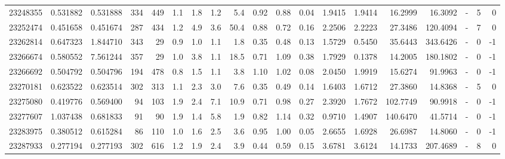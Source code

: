\begin{tabular}{rrrrrrrrrrrrrrrrlrr}
  23248355 & 0.531882 &   0.531888 &  334 &  449 &      1.1 &      1.8 &     1.2 &      5.4 &       0.92 &        0.88 &        0.04 &  1.9415 &  1.9414 &   16.2999 &   16.3092 &             - &        5 &          0 \\
  23252474 & 0.451658 &   0.451674 &  287 &  434 &      1.2 &      4.9 &     3.6 &     50.4 &       0.88 &        0.72 &        0.16 &  2.2506 &  2.2223 &   27.3486 &  120.4094 &             - &        7 &          0 \\
  23262814 & 0.647323 &   1.844710 &  343 &   29 &      0.9 &      1.0 &     1.1 &      1.8 &       0.35 &        0.48 &        0.13 &  1.5729 &  0.5450 &   35.6443 &  343.6426 &             - &        0 &         -1 \\
  23266674 & 0.580552 &   7.561244 &  357 &   29 &      1.0 &      3.8 &     1.1 &     18.5 &       0.71 &        1.09 &        0.38 &  1.7929 &  0.1378 &   14.2005 &  180.1802 &             - &        0 &         -1 \\
  23266692 & 0.504792 &   0.504796 &  194 &  478 &      0.8 &      1.5 &     1.1 &      3.8 &       1.10 &        1.02 &        0.08 &  2.0450 &  1.9919 &   15.6274 &   91.9963 &             - &        0 &         -1 \\
  23270181 & 0.623522 &   0.623514 &  302 &  313 &      1.1 &      2.3 &     3.0 &      7.6 &       0.35 &        0.49 &        0.14 &  1.6403 &  1.6712 &   27.3860 &   14.8368 &             - &        5 &          0 \\
  23275080 & 0.419776 &   0.569400 &   94 &  103 &      1.9 &      2.4 &     7.1 &     10.9 &       0.71 &        0.98 &        0.27 &  2.3920 &  1.7672 &  102.7749 &   90.9918 &             - &        0 &         -1 \\
  23277607 & 1.037438 &   0.681833 &   91 &   90 &      1.9 &      1.4 &     5.8 &      1.9 &       0.82 &        1.14 &        0.32 &  0.9710 &  1.4907 &  140.6470 &   41.5714 &             - &        0 &         -1 \\
  23283975 & 0.380512 &   0.615284 &   86 &  110 &      1.0 &      1.6 &     2.5 &      3.6 &       0.95 &        1.00 &        0.05 &  2.6655 &  1.6928 &   26.6987 &   14.8060 &             - &        0 &         -1 \\
  23287933 & 0.277194 &   0.277193 &  302 &  616 &      1.2 &      1.9 &     2.4 &      3.9 &       0.44 &        0.59 &        0.15 &  3.6781 &  3.6124 &   14.1733 &  207.4689 &             - &        8 &          0 \\

\end{tabular}
